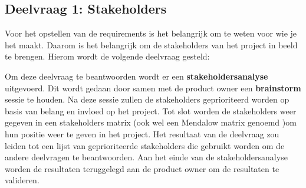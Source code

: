 \subsection{Deelvraag 1: Stakeholders}
Voor het opstellen van de requirements is het belangrijk om te weten voor wie je het maakt.
Daarom is het belangrijk om de stakeholders van het project in beeld te brengen.
Hierom wordt de volgende deelvraag gesteld:

\begin{center}
	\textit{\SubquestionOne}
\end{center}

\whitespace[0.2]
Om deze deelvraag te beantwoorden wordt er een \textbf{stakeholdersanalyse} uitgevoerd.
Dit wordt gedaan door samen met de product owner een \textbf{brainstorm} sessie te houden.
Na deze sessie zullen de stakeholders geprioriteerd worden op basis van belang en invloed op het project.
Tot slot worden de stakeholders weer gegeven in een stakeholders matrix (ook wel een Mendalow matrix genoemd \Parencite{MandelowMatrix})om hun positie weer te geven in het project.
Het resultaat van de deelvraag zou leiden tot een lijst van geprioriteerde stakeholders die gebruikt worden om de andere deelvragen te beantwoorden.
Aan het einde van de stakeholdersanalyse worden de resultaten teruggelegd aan de product owner om de resultaten te valideren.
